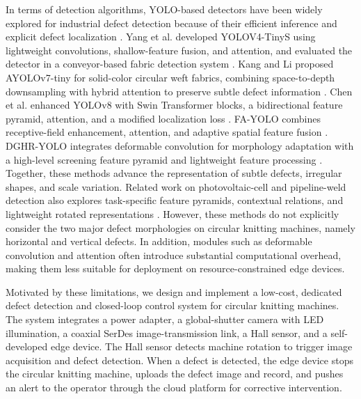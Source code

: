 \documentclass[journal]{IEEEtran}
\begin{document}
In terms of detection algorithms, YOLO-based detectors have been widely explored for industrial defect detection because of their efficient inference and explicit defect localization \cite{redmon2016yolo}. Yang et al. developed YOLOV4-TinyS using lightweight convolutions, shallow-feature fusion, and attention, and evaluated the detector in a conveyor-based fabric detection system \cite{yang2024yolov4tinys}. Kang and Li proposed AYOLOv7-tiny for solid-color circular weft fabrics, combining space-to-depth downsampling with hybrid attention to preserve subtle defect information \cite{kang2024ayolov7}. Chen et al. enhanced YOLOv8 with Swin Transformer blocks, a bidirectional feature pyramid, attention, and a modified localization loss \cite{chen2025yolov8}. FA-YOLO combines receptive-field enhancement, attention, and adaptive spatial feature fusion \cite{yu2024fayolo}. DGHR-YOLO integrates deformable convolution for morphology adaptation with a high-level screening feature pyramid and lightweight feature processing \cite{zhang2025dghr}. Together, these methods advance the representation of subtle defects, irregular shapes, and scale variation. Related work on photovoltaic-cell and pipeline-weld detection also explores task-specific feature pyramids, contextual relations, and lightweight rotated representations \cite{su2022baf,shen2024crnet,liu2025lrnet}. However, these methods do not explicitly consider the two major defect morphologies on circular knitting machines, namely horizontal and vertical defects. In addition, modules such as deformable convolution and attention often introduce substantial computational overhead, making them less suitable for deployment on resource-constrained edge devices.

Motivated by these limitations, we design and implement a low-cost, dedicated defect detection and closed-loop control system for circular knitting machines. The system integrates a power adapter, a global-shutter camera with LED illumination, a coaxial SerDes image-transmission link, a Hall sensor, and a self-developed edge device. The Hall sensor detects machine rotation to trigger image acquisition and defect detection. When a defect is detected, the edge device stops the circular knitting machine, uploads the defect image and record, and pushes an alert to the operator through the cloud platform for corrective intervention.
\end{document}
